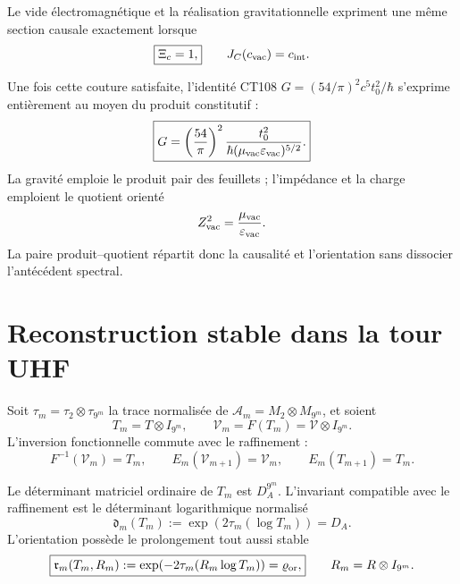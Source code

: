 \begin{criterion} \label{rm:crit:curve-causal-seam} Le vide électromagnétique et la réalisation gravitationnelle expriment une même section causale exactement lorsque
\begin{equation}
 \boxed{\Xi_c=1,}
 \qquad
 J_C(c_{\rm vac})=c_{\rm int}.
 \label{rm:eq:curve-Xi-one}
\end{equation}
\end{criterion}

Une fois cette couture satisfaite, l’identité CT108 \(
G=(54/\pi)^2c^5t_0^2/\hbar
\) s’exprime entièrement au moyen du produit constitutif :
\begin{equation}
 \boxed{
 G=\left(\frac{54}{\pi}\right)^2
 \frac{t_0^2}
 {\hbar(\mu_{\rm vac}\varepsilon_{\rm vac})^{5/2}}.}
 \label{rm:eq:curve-G-from-vacuum}
\end{equation}
La gravité emploie le produit pair des feuillets ; l’impédance et la charge emploient le quotient orienté
\begin{equation}
 Z_{\rm vac}^2=\frac{\mu_{\rm vac}}{\varepsilon_{\rm vac}}.
 \label{rm:eq:curve-Z-oriented}
\end{equation}
La paire produit--quotient répartit donc la causalité et l’orientation sans dissocier l’antécédent spectral.

\section{Reconstruction stable dans la tour UHF}

Soit \(\tau_m=\tau_2\otimes\tau_{9^m}\) la trace normalisée de \(\mathcal A_m=M_2\otimes M_{9^m}\), et soient
\begin{equation}
 T_m=T\otimes I_{9^m},
 \qquad
 \mathcal V_m=F(T_m)=\mathcal V\otimes I_{9^m}.
 \label{rm:eq:curve-UHF-TV}
\end{equation}
L’inversion fonctionnelle commute avec le raffinement :
\begin{equation}
 F^{-1}(\mathcal V_m)=T_m,
 \qquad
 E_m(\mathcal V_{m+1})=\mathcal V_m,
 \qquad
 E_m(T_{m+1})=T_m.
 \label{rm:eq:curve-UHF-inversion}
\end{equation}

Le déterminant matriciel ordinaire de \(T_m\) est \(D_A^{9^m}\). L’invariant compatible avec le raffinement est le déterminant logarithmique normalisé
\begin{equation}
 \boxed{
 \mathfrak d_m(T_m)
 :=\exp\!\left(2\tau_m(\log T_m)\right)=D_A.}
 \label{rm:eq:curve-normalized-determinant}
\end{equation}
L’orientation possède le prolongement tout aussi stable
\begin{equation}
 \boxed{
 \mathfrak r_m(T_m,R_m)
 :=\exp\!\left(-2\tau_m(R_m\log T_m)\right)
 =\varrho_{\rm or},}
 \qquad
 R_m=R\otimes I_{9^m}.
 \label{rm:eq:curve-normalized-orientation}
\end{equation}

